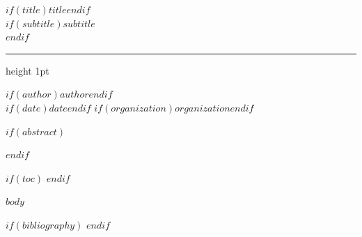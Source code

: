 \documentclass[$if(fontsize)$$fontsize$$else$11pt$endif$,$if(papersize)$$papersize$paper$else$letterpaper$endif$]{article}
\begin{document}
\begin{titlepage}
  \begin{center}
    \vspace*{2cm}
    {\LARGE\bfseries\color{headingcolor} $if(title)$$title$$endif$}\\[1em]
    $if(subtitle)${\large\itshape $subtitle$}\\[1em]$endif$
    \vspace{1cm}
    {\color{rulecolor}\hrule height 1pt}
    \vspace{1cm}
    {\large $if(author)$$author$$endif$}\\[0.5em]
    $if(date)${\normalsize $date$}$endif$
    \vfill
    $if(organization)${\normalsize $organization$}$endif$
  \end{center}
\end{titlepage}

$if(abstract)$
\begin{abstract}
\noindent $abstract$
\end{abstract}
\newpage
$endif$

$if(toc)$
\tableofcontents
\newpage
$endif$

$body$

$if(bibliography)$
\newpage
$endif$
\end{document}
